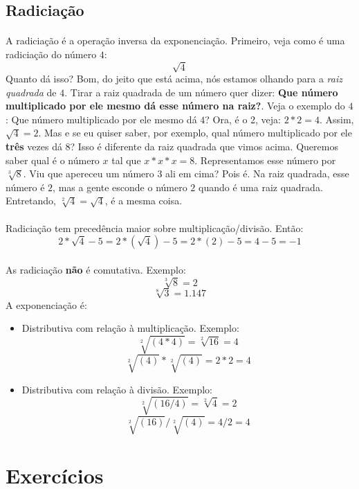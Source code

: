 \documentclass[12pt]{article}
\begin{document}
\subsection{Radiciação}
\paragraph{}
A radiciação é a operação inversa da exponenciação. 
Primeiro, veja como é uma radiciação do número $4$:
$$\sqrt{4}$$
Quanto dá isso? Bom, do jeito que está acima, nós estamos olhando para a 
\textit{raiz quadrada} de $4$. Tirar a raiz quadrada de um número quer dizer:
\textbf{Que número multiplicado por ele mesmo dá esse número na raiz?}. Veja
o exemplo do $4$: Que número multiplicado por ele mesmo dá $4$? Ora, é o 2,
veja: $2*2 = 4$. Assim, $\sqrt{4} = 2$.
Mas e se eu quiser saber, por exemplo, qual número multiplicado por ele 
\textbf{três} vezes dá $8$? Isso é diferente da raiz quadrada que vimos acima.
Queremos saber qual é o número $x$ tal que $x*x*x = 8$. Representamos esse
número por $\sqrt[3]{8}$. Viu que apereceu um número 3 ali em cima? Pois é. Na
raiz quadrada, esse número é $2$, mas a gente esconde o número $2$ quando é uma
raiz quadrada. Entretando, $\sqrt[2]{4} = \sqrt{4}$, é a mesma coisa.
\paragraph{}
Radiciação tem precedência maior sobre multiplicação/divisão. Então:
$$2 * \sqrt{4} - 5 = 2 * (\sqrt{4}) - 5 = 2 * (2) - 5 = 4 - 5 = -1$$
\paragraph{}
As radiciação \textbf{não} é comutativa. Exemplo:
$$\sqrt[3]{8} = 2$$
$$\sqrt[8]{3} = 1.147$$
A exponenciação é:
\begin{itemize}
\item Distributiva com relação à multiplicação. Exemplo:
$$\sqrt[2]{(4*4)} = \sqrt[2]{16} = 4$$
$$\sqrt[2]{(4)}*\sqrt[2]{(4)} = 2*2 = 4$$
\item Distributiva com relação à divisão. Exemplo:
$$\sqrt[2]{(16/4)} = \sqrt[2]{4} = 2$$
$$\sqrt[2]{(16)}/\sqrt[2]{(4)} = 4/2 = 4$$
\end{itemize}

\section{Exercícios}
\end{document}
